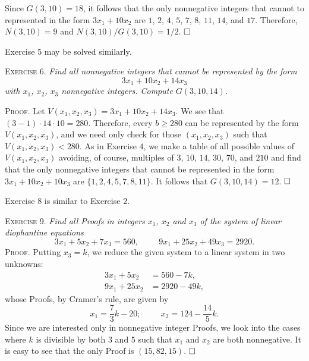 \documentclass[11pt, leqno]{article}
\newcommand{\done}{\ensuremath{\hfill\square}}
\begin{document}
Since $G(3,10)=18$, it follows that the only nonnegative integers that cannot to represented in the form $3x_1 + 10x_2$ are $1$, $2$, $4$, $5$, $7$, $8$, $11$, $14$, and $17$. Therefore, $N(3,10) = 9$ and $N(3,10)/G(3,10) = 1/2$. \done

Exercise $5$ may be solved similarly.

\textsc{Exercise 6}. \emph{Find all nonnegative integers that cannot be represented by the form 
\begin{displaymath}
3x_1 + 10x_2 + 14x_3
\end{displaymath}
with $x_1$, $x_2$, $x_3$ nonnegative integers. Compute $G(3,10,14)$.}

\textsc{Proof}. Let $V(x_1, x_2, x_3) = 3x_1 + 10x_2 + 14x_3$. We see that $(3-1)\cdot 14 \cdot 10 = 280$. Therefore, every $b\geq 280$ can be represented by the form $V(x_1, x_2, x_3)$, and we need only check for those $(x_1, x_2, x_3)$ such that $V(x_1, x_2, x_3) < 280$. As in Exercise $4$, we make a table of all possible values of $V(x_1, x_2, x_3)$ avoiding, of course, multiples of $3$, $10$, $14$, $30$, $70$, and $210$ and find that the only nonnegative integers that cannot be represented in the form $3x_1 + 10x_2 + 10x_3$ are $\{ 1, 2, 4, 5, 7, 8, 11 \}$. It follows that $G(3,10,14) = 12$. \done

Exercise $8$ is similar to Exercise $2$.

\textsc{Exercise 9}. \emph{Find all Proofs in integers $x_1$, $x_2$ and $x_3$ of the system of linear diophantine equations 
\begin{displaymath}
  3x_1 + 5x_2 + 7x_3 = 560, \hspace{1cm}
  9x_1 + 25x_2 + 49x_3 = 2920.
\end{displaymath}}\textsc{Proof}. Putting $x_3 = k$, we reduce the given system to a linear system in two unknowns: 
\begin{align*}
  3x_1 + 5x_2 &= 560 - 7k, \\
  9x_1 + 25x_2 &= 2920 - 49k,
\end{align*}
whose Proofs, by Cramer's rule, are given by 
\begin{displaymath}
x_1 = \frac{7}{3}k - 20; \hspace{1cm} x_2 = 124 - \frac{14}{5}k.
\end{displaymath}
Since we are interested only in nonnegative integer Proofs, we look into the cases where $k$ is divisible by both $3$ and $5$ such that $x_1$ and $x_2$ are both nonnegative. It is easy to see that the only Proof is $(15, 82, 15)$. \done
\end{document}
